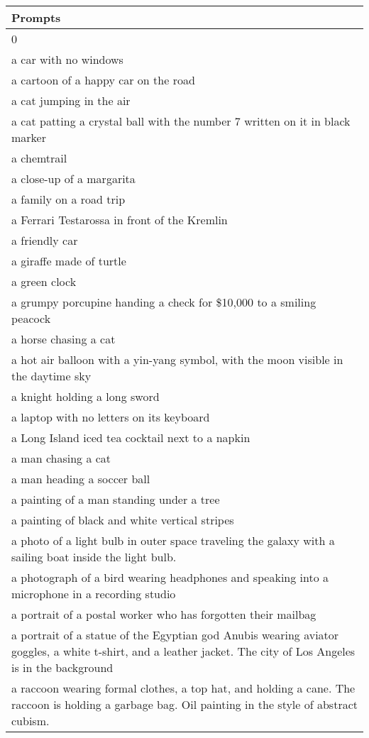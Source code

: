\begin{table*}[p]
\centering
\begin{tabular}{|p{\textwidth}|}
\hline
\textbf{Prompts} \\ \hline
0 \\
a car with no windows \\
a cartoon of a happy car on the road \\
a cat jumping in the air \\
a cat patting a crystal ball with the number 7 written on it in black marker \\
a chemtrail \\
a close-up of a margarita \\
a family on a road trip \\
a Ferrari Testarossa in front of the Kremlin \\
a friendly car \\
a giraffe made of turtle \\
a green clock \\
a grumpy porcupine handing a check for \$10,000 to a smiling peacock \\
a horse chasing a cat \\
a hot air balloon with a yin-yang symbol, with the moon visible in the daytime sky \\
a knight holding a long sword \\
a laptop with no letters on its keyboard \\
a Long Island iced tea cocktail next to a napkin \\
a man chasing a cat \\
a man heading a soccer ball \\
a painting of a man standing under a tree \\
a painting of black and white vertical stripes \\
a photo of a light bulb in outer space traveling the galaxy with a sailing boat inside the light bulb. \\
a photograph of a bird wearing headphones and speaking into a microphone in a recording studio \\
a portrait of a postal worker who has forgotten their mailbag \\
a portrait of a statue of the Egyptian god Anubis wearing aviator goggles, a white t-shirt, and a leather jacket. The city of Los Angeles is in the background \\
a raccoon wearing formal clothes, a top hat, and holding a cane. The raccoon is holding a garbage bag. Oil painting in the style of abstract cubism. \\

\end{tabular}
\end{table*}
